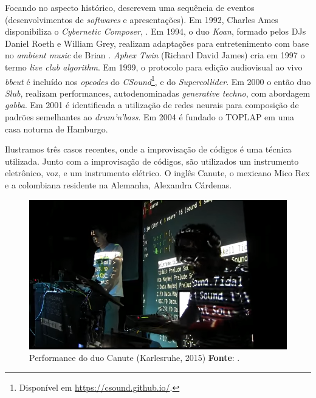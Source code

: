 Focando no aspecto histórico,  descrevem uma sequência de eventos (desenvolvimentos de \emph{softwares} e apresentações). Em 1992, Charles Ames disponibiliza o \emph{Cybernetic Composer}, . Em 1994, o duo \emph{Koan}, formado pelos DJs Daniel Roeth e William Grey, realizam adaptações para entretenimento com base no \emph{ambient music} de Brian . \emph{Aphex Twin} (Richard David James) cria em 1997 o termo \emph{live club algorithm}. Em 1999, o protocolo para edição audiovisual ao vivo \emph{bbcut} \cite{collins_bbcut_2003} é incluído nos \emph{opcodes} do \emph{CSound}\footnote{Disponível em \url{https://csound.github.io/}.}, e do \emph{Supercollider}. Em 2000 o então duo \emph{Slub}, realizam performances, autodenominadas \emph{generative techno}, com abordagem \emph{gabba}. Em 2001 é identificada a utilização de redes neurais para composição de padrões semelhantes ao \emph{drum'n'bass}. Em 2004 é fundado o TOPLAP em uma casa noturna de Hamburgo.

Ilustramos três casos recentes, onde a improvisação de códigos é uma técnica utilizada. Junto com a improvisação de códigos, são utilizados um instrumento eletrônico, voz, e um instrumento elétrico. O inglês Canute, o mexicano Mico Rex e a colombiana residente na Alemanha, Alexandra Cárdenas.

\begin{figure}[!h]
  \centering
  \includegraphics[scale=0.71]{imagens/canute.png}
  \caption{Performance do duo Canute (Karlesruhe, 2015) \textbf{Fonte}: .}
  \label{fig:canute}
\end{figure}

